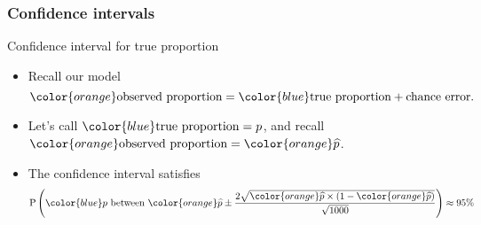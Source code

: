 \documentclass[handout]{beamer}
\begin{document}

   \begin{frame} \frametitle{Confidence intervals}

   \begin{block}
   {Confidence interval for true proportion}
   \begin{itemize}
   \item Recall our model
   $$
   {\color{orange} \text{observed proportion}} = {\color{blue} \text{true proportion}} + \text{chance error}.
   $$
   \item Let's call ${\color{blue} \text{true proportion}=p}$, and recall
   ${\color{orange} \text{observed proportion}} = {\color{orange} \widehat{p}}$.
   \item The confidence interval satisfies
   $$
   \begin{aligned}
   \text{P} \left(\text{${\color{blue} p}$ between ${\color{orange} \widehat{p}} \pm \frac{2\sqrt{{\color{orange} \widehat{p}} \times (1-{\color{orange} \widehat{p}})}}{\sqrt{1000}}$}\right) &\approx 95\% \\
   \end{aligned}
   $$

   \end{itemize}
   \end{block}
   \end{frame}

\end{document}
